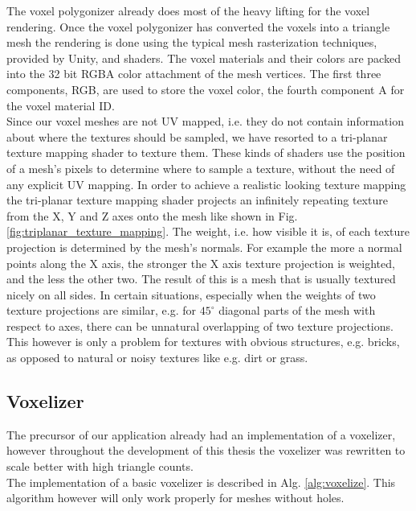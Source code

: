 The voxel polygonizer already does most of the heavy lifting for the voxel rendering. Once the voxel polygonizer has converted the voxels into a triangle mesh the rendering is done using the typical mesh rasterization techniques, provided by Unity, and shaders. The voxel materials and their colors are packed into the 32 bit RGBA color attachment of the mesh vertices. The first three components, RGB, are used to store the voxel color, the fourth component A for the voxel material ID.\\
Since our voxel meshes are not UV mapped, i.e. they do not contain information about where the textures should be sampled, we have resorted to a tri-planar texture mapping shader to texture them. These kinds of shaders use the position of a mesh's pixels to determine where to sample a texture, without the need of any explicit UV mapping. In order to achieve a realistic looking texture
mapping the tri-planar texture mapping shader projects an infinitely repeating texture from the X, Y and Z axes onto the mesh
like shown in Fig. \ref{fig:triplanar_texture_mapping}. The weight, i.e. how visible it is, of each texture projection is determined by the mesh's normals. For example the more a normal points along the X axis, the stronger the X axis texture projection is weighted, and the less the other two. The result of this is a mesh
that is usually textured nicely on all sides. In certain situations, especially when the weights of two texture projections are similar, e.g. for $45^{\circ}$ diagonal parts of the mesh with respect to axes, there can be unnatural overlapping of two texture projections. This however is only a problem for textures with obvious structures, e.g. bricks, as opposed to natural or noisy textures like e.g. dirt or grass.

\subsection{Voxelizer}

The precursor of our application already had an implementation of a voxelizer, however throughout the development of this thesis
the voxelizer was rewritten to scale better with high triangle counts.\\
The implementation of a basic voxelizer is described in Alg. \ref{alg:voxelize}. This algorithm however will only work properly
for meshes without holes.


